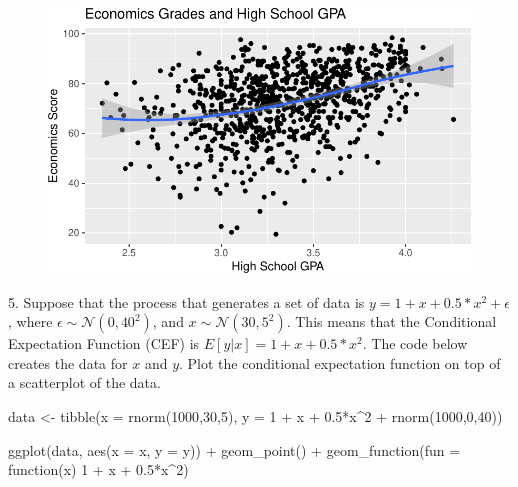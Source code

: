\documentclass[
  letterpaper,
  DIV=11,
  numbers=noendperiod]{scrartcl}
\newenvironment{Shaded}{\begin{snugshade}}{\end{snugshade}}
\newcommand{\AttributeTok}[1]{\textcolor[rgb]{0.40,0.45,0.13}{#1}}
\newcommand{\ControlFlowTok}[1]{\textcolor[rgb]{0.00,0.23,0.31}{#1}}
\newcommand{\DecValTok}[1]{\textcolor[rgb]{0.68,0.00,0.00}{#1}}
\newcommand{\FloatTok}[1]{\textcolor[rgb]{0.68,0.00,0.00}{#1}}
\newcommand{\FunctionTok}[1]{\textcolor[rgb]{0.28,0.35,0.67}{#1}}
\newcommand{\NormalTok}[1]{\textcolor[rgb]{0.00,0.23,0.31}{#1}}
\newcommand{\OtherTok}[1]{\textcolor[rgb]{0.00,0.23,0.31}{#1}}
\newcommand{\SpecialCharTok}[1]{\textcolor[rgb]{0.37,0.37,0.37}{#1}}
\begin{document}
\begin{figure}[H]

{\centering \includegraphics{a1template_files/figure-pdf/unnamed-chunk-5-1.pdf}

}

\end{figure}

5. Suppose that the process that generates a set of data is
\(y = 1 + x + 0.5*x^2 + \epsilon\), where
\(\epsilon \sim \mathcal{N}(0,40^2)\), and
\(x \sim \mathcal{N}(30,5^2)\). This means that the Conditional
Expectation Function (CEF) is \(E[y|x] = 1 + x + 0.5*x^2\). The code
below creates the data for \(x\) and \(y\). Plot the conditional
expectation function on top of a scatterplot of the data.

\begin{Shaded}
\begin{Highlighting}[]
\NormalTok{data }\OtherTok{\textless{}{-}} \FunctionTok{tibble}\NormalTok{(}\AttributeTok{x =} \FunctionTok{rnorm}\NormalTok{(}\DecValTok{1000}\NormalTok{,}\DecValTok{30}\NormalTok{,}\DecValTok{5}\NormalTok{),}
               \AttributeTok{y =} \DecValTok{1} \SpecialCharTok{+}\NormalTok{ x }\SpecialCharTok{+} \FloatTok{0.5}\SpecialCharTok{*}\NormalTok{x}\SpecialCharTok{\^{}}\DecValTok{2} \SpecialCharTok{+} \FunctionTok{rnorm}\NormalTok{(}\DecValTok{1000}\NormalTok{,}\DecValTok{0}\NormalTok{,}\DecValTok{40}\NormalTok{))}

\FunctionTok{ggplot}\NormalTok{(data, }\FunctionTok{aes}\NormalTok{(}\AttributeTok{x =}\NormalTok{ x, }\AttributeTok{y =}\NormalTok{ y)) }\SpecialCharTok{+} 
  \FunctionTok{geom\_point}\NormalTok{() }\SpecialCharTok{+} 
  \FunctionTok{geom\_function}\NormalTok{(}\AttributeTok{fun =} \ControlFlowTok{function}\NormalTok{(x) }\DecValTok{1} \SpecialCharTok{+}\NormalTok{ x }\SpecialCharTok{+} \FloatTok{0.5}\SpecialCharTok{*}\NormalTok{x}\SpecialCharTok{\^{}}\DecValTok{2}\NormalTok{)}
\end{Highlighting}
\end{Shaded}
\end{document}

